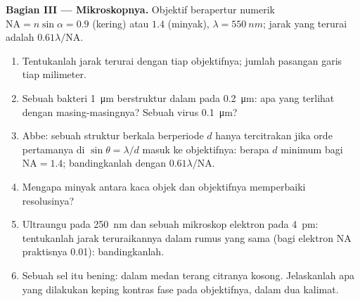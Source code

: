 \begin{problem}
\medskip
\noindent\textbf{Bagian III --- Mikroskopnya.}
Objektif berapertur numerik $\mathrm{NA} = n\sin\alpha = 0.9$ (kering) atau $1.4$
(minyak), $\lambda = \qty{550}{nm}$; jarak yang terurai adalah $0.61\lambda/\mathrm{NA}$.
\begin{enumerate}[resume]
  \item Tentukanlah jarak terurai dengan tiap objektifnya; jumlah pasangan garis
        tiap milimeter.
  \item Sebuah bakteri \qty{1}{\micro m} berstruktur dalam pada
        \qty{0.2}{\micro m}: apa yang terlihat dengan masing-masingnya? Sebuah virus \qty{0.1}{\micro m}?
  \item Abbe: sebuah struktur berkala berperiode $d$ hanya tercitrakan jika
        orde pertamanya di $\sin\theta = \lambda/d$ masuk ke objektifnya: berapa $d$ minimum
        bagi $\mathrm{NA} = 1.4$; bandingkanlah dengan $0.61\lambda/\mathrm{NA}$.
  \item Mengapa minyak antara kaca objek dan objektifnya memperbaiki
        resolusinya?
  \item Ultraungu pada \qty{250}{nm} dan sebuah mikroskop elektron pada \qty{4}{pm}:
        tentukanlah jarak teruraikannya dalam rumus yang sama (bagi elektron
        NA praktisnya \qty{0.01}{}): bandingkanlah.
  \item Sebuah sel itu bening: dalam medan terang citranya kosong.
        Jelaskanlah apa yang dilakukan keping kontras fase pada
         objektifnya, dalam dua kalimat.
\end{enumerate}


\end{problem}
